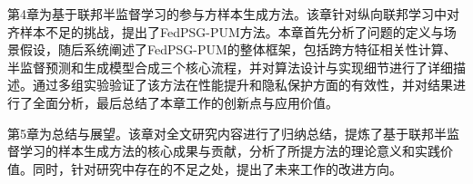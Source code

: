 第4章为基于联邦半监督学习的参与方样本生成方法。该章针对纵向联邦学习中对齐样本不足的挑战，提出了FedPSG-PUM方法。本章首先分析了问题的定义与场景假设，随后系统阐述了FedPSG-PUM的整体框架，包括跨方特征相关性计算、半监督预测和生成模型合成三个核心流程，并对算法设计与实现细节进行了详细描述。通过多组实验验证了该方法在性能提升和隐私保护方面的有效性，并对结果进行了全面分析，最后总结了本章工作的创新点与应用价值。

第5章为总结与展望。该章对全文研究内容进行了归纳总结，提炼了基于联邦半监督学习的样本生成方法的核心成果与贡献，分析了所提方法的理论意义和实践价值。同时，针对研究中存在的不足之处，提出了未来工作的改进方向。
\clearpage




